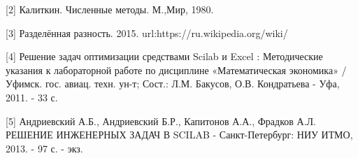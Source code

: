 \documentclass[russian,utf8,nocolumnxxxi,nocolumnxxxii]{eskdtext}
\begin{document}
[2] Калиткин. Численные методы. М.,Мир, 1980.

[3] Разделённая разность. 2015. url:https://ru.wikipedia.org/wiki/%

[4] Решение задач оптимизации средствами Scilab и Excel : Методические указания к лабораторной работе по дисциплине «Математическая экономика» / Уфимск. гос. авиац. техн. ун-т; Сост.: Л.М. Бакусов, О.В. Кондратьева - Уфа, 2011. - 33 с.

[5] Андриевский А.Б., Андриевский Б.Р., Капитонов А.А., Фрадков А.Л. РЕШЕНИЕ ИНЖЕНЕРНЫХ ЗАДАЧ В SCILAB - Санкт-Петербург: НИУ ИТМО, 2013. - 97 с. - экз.
\end{document}
